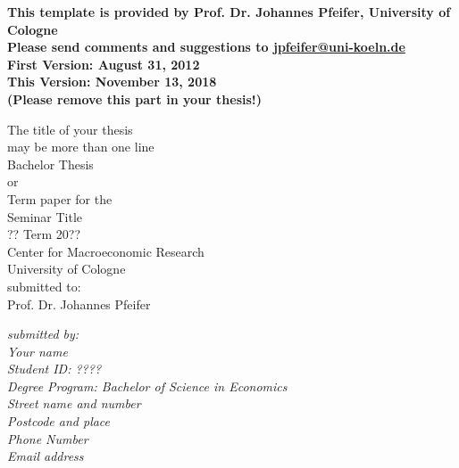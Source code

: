 \documentclass[a4paper,12pt]{scrartcl} %
\begin{document}




\begin{titlepage}

\thispagestyle{empty}   %
\begin{center}
\textbf{
This template is provided by Prof. Dr. Johannes Pfeifer, University of Cologne\\
Please send comments and suggestions to \href{mailto:jpfeifer@uni-koeln.de}{jpfeifer@uni-koeln.de}\\
First Version: August 31, 2012\\
This Version: November 13, 2018\\
(Please remove this part in your thesis!)
}
\end{center}


\begin{center}
\vspace*{2.cm}
{\textbf  \Large The title of your thesis\\may be more than one line} \\
\vspace*{2cm}
Bachelor Thesis\\
or\\
Term paper for the \\ Seminar Title  \\ ?? Term 20??\\
\vspace{0.5cm}
Center for Macroeconomic Research\\
University of Cologne\\
\vspace*{0.5cm}
submitted to:\\
Prof. Dr. Johannes Pfeifer\\
\vspace*{0.5cm}

\end{center}


\vfill
\begin{flushright}
   \emph{submitted by:} \\
   \emph{Your name} \\
   \emph{Student ID: ????}\\
    \emph{Degree Program: Bachelor of Science in Economics}\\
   \vspace*{0.5cm}
    \emph{Street name and number}\\
    \emph{Postcode and place}\\
   \emph{Phone Number}\\
   \emph{Email address}\\
\end{flushright}


\end{titlepage}
\end{document}
